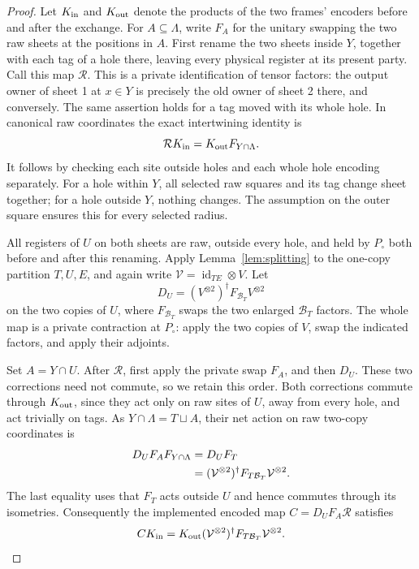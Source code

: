 \documentclass[11pt]{article}
\numberwithin{equation}{section}
\theoremstyle{definition}
\theoremstyle{remark}
\DeclareMathOperator{\id}{id}
\begin{document}
\begin{proof}
Let $K_{\rm in}$ and $K_{\rm out}$ denote the products of the two frames'
encoders before and after the exchange.  For $A\subseteq\Lambda$, write
$F_A$ for the unitary swapping the two raw sheets at the positions in $A$.
First rename the two sheets inside $Y$, together with each tag of a hole
there, leaving every physical register at its present party.  Call this
map $\mathcal R$.  This is a private identification of tensor factors: the
output owner of sheet 1 at $x\in Y$ is precisely the old owner of sheet 2
there, and conversely.  The same assertion holds for a tag moved with its
whole hole.  In canonical raw coordinates the exact intertwining identity
is
\begin{equation}\label{eq:exchange-intertwining}
  \mathcal R K_{\rm in}=K_{\rm out}F_{Y\cap\Lambda}.
\end{equation}
It follows by checking each site outside holes and each whole hole
encoding separately.  For a hole within $Y$, all selected raw squares and
its tag change sheet together; for a hole outside $Y$, nothing changes.
The assumption on the outer square ensures this for every selected radius.

All registers of $U$ on both sheets are raw, outside every hole, and held
by $P_\circ$ both before and after this renaming.  Apply
Lemma~\ref{lem:splitting} to the one-copy partition $T,U,E$, and again write
$\mathcal V=\id_{TE}\otimes V$.  Let
\begin{equation}\label{eq:exchange-buffer-correction}
 D_U=(V^{\otimes2})^{\dagger}F_{\mathcal B_T}V^{\otimes2}
\end{equation}
on the two copies of $U$, where $F_{\mathcal B_T}$ swaps the two enlarged
$\mathcal B_T$ factors.  The whole map is a private contraction at
$P_\circ$: apply the two copies of $V$, swap the indicated factors, and
apply their adjoints.

Set $A=Y\cap U$.  After $\mathcal R$, first apply the private swap $F_A$,
and then $D_U$.  These two corrections need not commute, so we retain this
order.  Both corrections commute through $K_{\rm out}$, since they act
only on raw sites of $U$, away from every hole, and act trivially on tags.
As $Y\cap\Lambda=T\sqcup A$, their net action on raw two-copy coordinates
is
\begin{align}
 D_UF_AF_{Y\cap\Lambda}
   &=D_UF_T\notag\\
   &=(\mathcal V^{\otimes2})^{\dagger}
          F_{T\mathcal B_T}\mathcal V^{\otimes2}.
              \label{eq:exchange-net-map}
\end{align}
The last equality uses that $F_T$ acts outside $U$ and hence commutes
through its isometries.  Consequently the implemented encoded map
$C=D_UF_A\mathcal R$ satisfies
\begin{equation}\label{eq:exchange-exact-map}
 CK_{\rm in}
   =K_{\rm out}(\mathcal V^{\otimes2})^{\dagger}
                   F_{T\mathcal B_T}\mathcal V^{\otimes2}.
\end{equation}


\end{proof}
\end{document}
